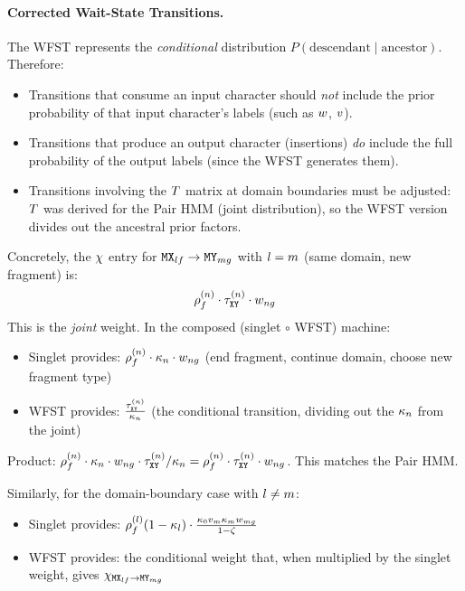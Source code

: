 \paragraph{Corrected Wait-State Transitions.}
The WFST represents the \emph{conditional} distribution $P(\text{descendant} \mid \text{ancestor})$.
Therefore:
\begin{itemize}
\item Transitions that consume an input character should \emph{not} include the prior
  probability of that input character's labels (such as $w$, $v$).
\item Transitions that produce an output character (insertions) \emph{do} include
  the full probability of the output labels (since the WFST generates them).
\item Transitions involving the $T$ matrix at domain boundaries must be
  adjusted: $T$ was derived for the Pair HMM (joint distribution),
  so the WFST version divides out the ancestral prior factors.
\end{itemize}

Concretely, the $\chi$ entry for
${\tt M}{\tt X}_{lf} \to {\tt M}{\tt Y}_{mg}$ with $l = m$
(same domain, new fragment) is:
\[
\rho^{(n)}_f \cdot \tau^{(n)}_{{\tt X}{\tt Y}} \cdot w_{ng}
\]
This is the \emph{joint} weight.
In the composed (singlet $\circ$ WFST) machine:
\begin{itemize}
\item Singlet provides: $\rho^{(n)}_f \cdot \kappa_n \cdot w_{ng}$
  (end fragment, continue domain, choose new fragment type)
\item WFST provides: $\frac{\tau^{(n)}_{{\tt X}{\tt Y}}}{\kappa_n}$
  (the conditional transition, dividing out the $\kappa_n$ from the joint)
\end{itemize}
Product: $\rho^{(n)}_f \cdot \kappa_n \cdot w_{ng}
\cdot \tau^{(n)}_{{\tt X}{\tt Y}} / \kappa_n
= \rho^{(n)}_f \cdot \tau^{(n)}_{{\tt X}{\tt Y}} \cdot w_{ng}$.
This matches the Pair HMM. \checkmark

Similarly, for the domain-boundary case with $l \neq m$:
\begin{itemize}
\item Singlet provides: $\rho^{(l)}_f (1-\kappa_{l}) \cdot
  \frac{\kappa_0 v_{m} \kappa_{m} w_{mg}}{1-\zeta}$
\item WFST provides: the conditional weight that, when multiplied by the singlet weight,
  gives $\chi_{{\tt M}{\tt X}_{lf} \to {\tt M}{\tt Y}_{mg}}$
\end{itemize}

